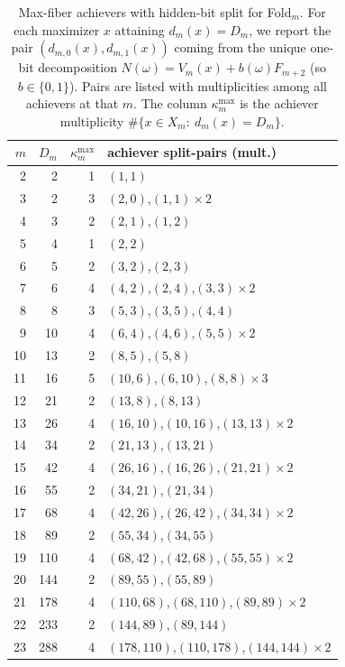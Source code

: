 \begin{table}[H]
\centering
\scriptsize
\setlength{\tabcolsep}{6pt}
\caption{Max-fiber achievers with hidden-bit split for Fold$_m$. For each maximizer $x$ attaining $d_m(x)=D_m$, we report the pair $(d_{m,0}(x),d_{m,1}(x))$ coming from the unique one-bit decomposition $N(\omega)=V_m(x)+b(\omega)F_{m+2}$ (so $b\in\{0,1\}$). Pairs are listed with multiplicities among all achievers at that $m$. The column $\kappa_m^{\mathrm{max}}$ is the achiever multiplicity $\#\{x\in X_m:\ d_m(x)=D_m\}$.}
\label{tab:fold_max_fiber_achievers_bsplit}
\begin{tabular}{r r r l}
\toprule
$m$ & $D_m$ & $\kappa_m^{\mathrm{max}}$ & achiever split-pairs (mult.)\\
\midrule
2 & 2 & 1 & $(1,1)$\\
3 & 2 & 3 & $(2,0)$,\;$(1,1)\times 2$\\
4 & 3 & 2 & $(2,1)$,\;$(1,2)$\\
5 & 4 & 1 & $(2,2)$\\
6 & 5 & 2 & $(3,2)$,\;$(2,3)$\\
7 & 6 & 4 & $(4,2)$,\;$(2,4)$,\;$(3,3)\times 2$\\
8 & 8 & 3 & $(5,3)$,\;$(3,5)$,\;$(4,4)$\\
9 & 10 & 4 & $(6,4)$,\;$(4,6)$,\;$(5,5)\times 2$\\
10 & 13 & 2 & $(8,5)$,\;$(5,8)$\\
11 & 16 & 5 & $(10,6)$,\;$(6,10)$,\;$(8,8)\times 3$\\
12 & 21 & 2 & $(13,8)$,\;$(8,13)$\\
13 & 26 & 4 & $(16,10)$,\;$(10,16)$,\;$(13,13)\times 2$\\
14 & 34 & 2 & $(21,13)$,\;$(13,21)$\\
15 & 42 & 4 & $(26,16)$,\;$(16,26)$,\;$(21,21)\times 2$\\
16 & 55 & 2 & $(34,21)$,\;$(21,34)$\\
17 & 68 & 4 & $(42,26)$,\;$(26,42)$,\;$(34,34)\times 2$\\
18 & 89 & 2 & $(55,34)$,\;$(34,55)$\\
19 & 110 & 4 & $(68,42)$,\;$(42,68)$,\;$(55,55)\times 2$\\
20 & 144 & 2 & $(89,55)$,\;$(55,89)$\\
21 & 178 & 4 & $(110,68)$,\;$(68,110)$,\;$(89,89)\times 2$\\
22 & 233 & 2 & $(144,89)$,\;$(89,144)$\\
23 & 288 & 4 & $(178,110)$,\;$(110,178)$,\;$(144,144)\times 2$\\

\end{tabular}
\end{table}
